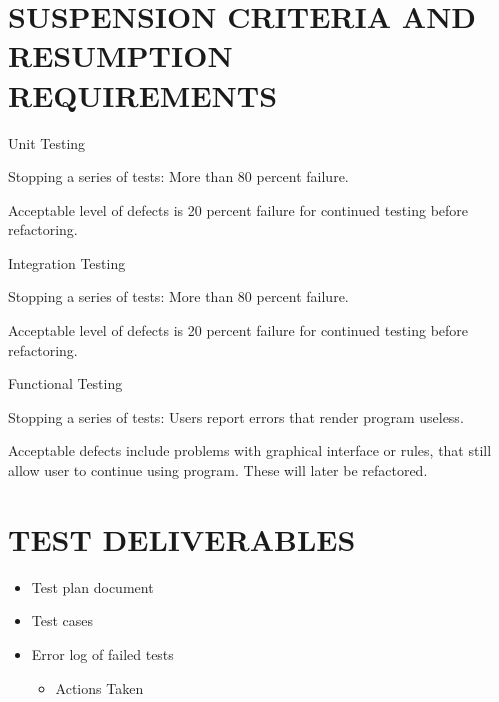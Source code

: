 \documentclass[twoside,letterpaper]{article}
\begin{document}
\section[SUSPENSION CRITERIA]{\bfseries\color{black}
	 SUSPENSION CRITERIA AND RESUMPTION REQUIREMENTS}

{\color{black}
\begin{list}{-}{ }
\item Unit Testing
\begin{list}{-}{ }
\item Stopping a series of tests: More than 80 percent failure.
\item Acceptable level of defects is 20 percent failure for continued testing before refactoring.
\end{list}
\item Integration Testing
\begin{list}{-}{ }
\item Stopping a series of tests: More than 80 percent failure.
\item Acceptable level of defects is 20 percent failure for continued testing before refactoring.
\end{list}
\item Functional Testing
\begin{list}{-}{ }
\item Stopping a series of tests: Users report errors that render program useless.
\item Acceptable defects include problems with graphical interface or rules, that still allow user to continue using program. These will later be refactored.
\end{list}

\end{list}
}

\section[TEST DELIVERABLES]{\bfseries\color{black} TEST DELIVERABLES}
{\color{black}
\begin{itemize}
\item Test plan document
\item Test cases 
\item Error log of failed tests
\begin{itemize}
\item Actions Taken
\end{itemize}
\end{itemize}
}
\end{document}
